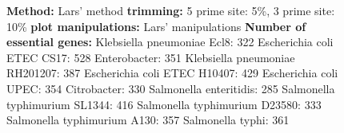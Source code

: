 \documentclass[a4paper,10pt]{article}
\begin{document}
\begin{figure}
{\textbf{Method:} Lars' method \newline
\textbf{trimming:} 5 prime site: 5\%, 3 prime site: 10\%\newline
\textbf{plot manipulations:} Lars' manipulations
\textbf{Number of essential genes:}\newline
Klebsiella pneumoniae Ecl8: 322 \newline
Escherichia coli ETEC CS17: 528 \newline
Enterobacter: 351 \newline
Klebsiella pneumoniae RH201207: 387 \newline
Escherichia coli ETEC H10407: 429 \newline
Escherichia coli UPEC: 354 \newline
Citrobacter: 330 \newline
Salmonella enteritidis: 285 \newline
Salmonella typhimurium SL1344: 416 \newline
Salmonella typhimurium D23580: 333 \newline
Salmonella typhimurium A130: 357 \newline
Salmonella typhi: 361}
\end{figure}
\end{document}
